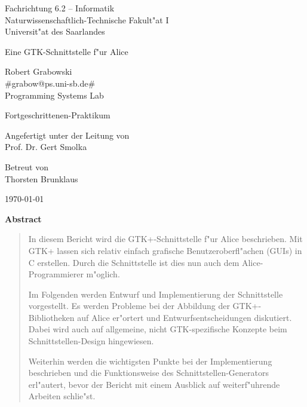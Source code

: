 \documentclass[a4paper,titlepage]{article}
\begin{document}
\begin{titlepage}
  \begin{small}\noindent Fachrichtung 6.2 -- Informatik\\
  Naturwissenschaftlich-Technische Fakult"at I\\
  Universit"at des Saarlandes\\
  \end{small}
  \vspace{1cm}

  \begin{center}

    {\LARGE Eine GTK-Schnittstelle f"ur Alice}
    \vspace{1cm}

    Robert Grabowski\\
    #grabow@ps.uni-sb.de#\\
    Programming Systems Lab

    \vspace{1cm}
    {\Large Fortgeschrittenen-Praktikum}

    \vspace{1cm}
    Angefertigt unter der Leitung von\\
    Prof. Dr. Gert Smolka

    \vspace{1cm}
    Betreut von\\
    Thorsten Brunklaus
    
    \vspace{1cm}
    \today

    \vspace{2cm}  
    \textbf{Abstract}
  \end{center}

  \begin{quotation}
  In diesem Bericht wird die
  GTK+-Schnittstelle f"ur Alice beschrieben. Mit GTK+ \cite{wwwgtkorg}
  lassen sich relativ einfach grafische Benutzeroberfl"achen (GUIs)
  in C erstellen. 
  Durch die Schnittstelle ist dies nun auch dem
  Alice-Programmierer m"oglich.
  
  Im Folgenden werden Entwurf und Implementierung der Schnittstelle
  vorgestellt. Es werden Probleme bei
  der Abbildung der GTK+-Bibliotheken auf Alice er"ortert und
  Entwurfsentscheidungen diskutiert.
  Dabei wird auch auf allgemeine, nicht GTK-spezifische Konzepte beim
  Schnittstellen-Design hingewiesen.

  Weiterhin werden die wichtigsten Punkte bei der Implementierung beschrieben
  und die Funktionsweise des Schnittstellen-Generators erl"autert,
  bevor der Bericht mit einem Ausblick auf weiterf"uhrende Arbeiten schlie"st.

  \end{quotation}

\end{titlepage}
\end{document}
